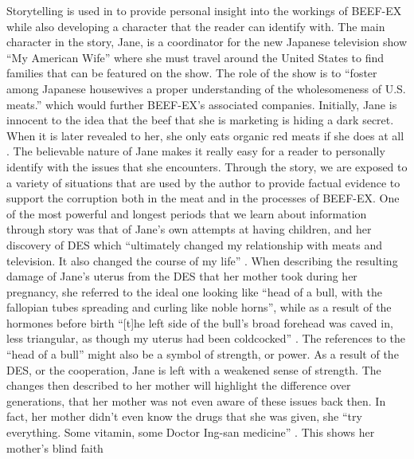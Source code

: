 \documentclass{article}
\begin{document}
%

Storytelling is used in  to provide personal insight
into the workings of BEEF-EX while also developing a character that the
reader can identify with. The main character in the story, Jane, is a
coordinator for the new Japanese television show ``My American Wife'' where
she must travel around the United States to find families that can be
featured on the show. The role of the show is to ``foster among Japanese
housewives a proper understanding of the wholesomeness of U.S. meats.''
\cite[Ch. 1]{ozeki1998my} which would further BEEF-EX's associated
companies. Initially, Jane is innocent to the idea that the beef that she is
marketing is hiding a dark secret. When it is later revealed to her, she
only eats organic red meats if she does at all \cite[Ch. 9]{ozeki1998my}.
The believable nature of Jane makes it really easy for a reader to
personally identify with the issues that she encounters. Through the story,
we are exposed to a variety of situations that are used by the author to
provide factual evidence to support the corruption both in the meat and in
the processes of BEEF-EX. One of the most powerful and longest periods that
we learn about information through story was that of Jane's own attempts at
having children, and her discovery of DES which ``ultimately changed my
relationship with meats and television. It also changed the course of my
life'' \cite[Ch. 6]{ozeki1998my}. When describing the resulting damage of
Jane's uterus from the DES that her mother took during her pregnancy, she
referred to the ideal one looking like ``head of a bull, with the fallopian
tubes spreading and curling like noble horns'', while as a result of the
hormones before birth ``[t]he left side of the bull’s broad forehead was
caved in, less triangular, as though my uterus had been coldcocked''
\cite[Ch. 7]{ozeki1998my}. The references to the ``head of a bull''
\cite[Ch. 7]{ozeki1998my} might also be a symbol of strength, or power. As a
result of the DES, or the cooperation, Jane is left with a weakened sense of
strength. The changes then described to her mother will highlight the
difference over generations, that her mother was not even aware of these
issues back then. In fact, her mother didn't even know the drugs that she
was given, she ``try everything. Some vitamin, some Doctor Ing-san
medicine'' \cite[Ch. 11]{ozeki1998my}. This shows her mother's blind faith
\end{document}
